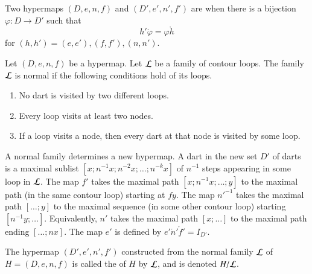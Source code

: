 \begin{definition}[isomorphism] Two hypermaps $(D,e,n,f)$ and
$(D',e',n',f')$ are  when there is a bijection
$\varphi:D\to D'$ such that
\begin{displaymath}h'\ocirc \varphi = \varphi\ocirc h\end{displaymath}
for $(h,h')=(e,e'), (f,f'), (n,n')$.
%
%
\end{definition}


\begin{definition}
Let $(D,e,n,f)$ be a hypermap. 
Let $\cal L$ be a family of contour
loops.  The family $\cal L$ is  normal if the following
conditions hold of its loops. \begin{enumerate}
\item  No dart is visited by two different loops.
\item  Every loop visits at least two nodes.
\item  If a loop visits a node, then every dart at that node is visited
by some loop.
\end{enumerate}
%
\end{definition}

A normal family determines a new hypermap.  A dart in the new set $D'$
of darts is a maximal sublist $[x;n^{-1} x; n^{-2} x;\ldots;n^{-k}
x]$ of $n^{-1}$ steps appearing in some loop in $\cal L$. The map $f'$
takes the maximal path $[x;n^{-1}x;\ldots;y]$ to the maximal path (in
the same contour loop) starting at $f y$. The map ${n'}^{-1}$ takes
the maximal path $[\ldots;y]$ to the maximal sequence (in some other
contour loop) starting $[n^{-1}y;\ldots]$. Equivalently, $n'$ takes
the maximal path $[x;\ldots]$ to the maximal path ending $[\ldots;n
x]$. The map $e'$ is defined by $e'\ocirc n'\ocirc f' = I_{D'}$.
%

\begin{definition}[quotient] The hypermap $(D',e',n',f')$
constructed from the normal
family $\cal L$ of $H=(D,e,n,f)$ 
is called the  of $H$ by $\cal L$, and is denoted
$H/{\cal L}$.  
%
\end{definition}
%
%
%
%

